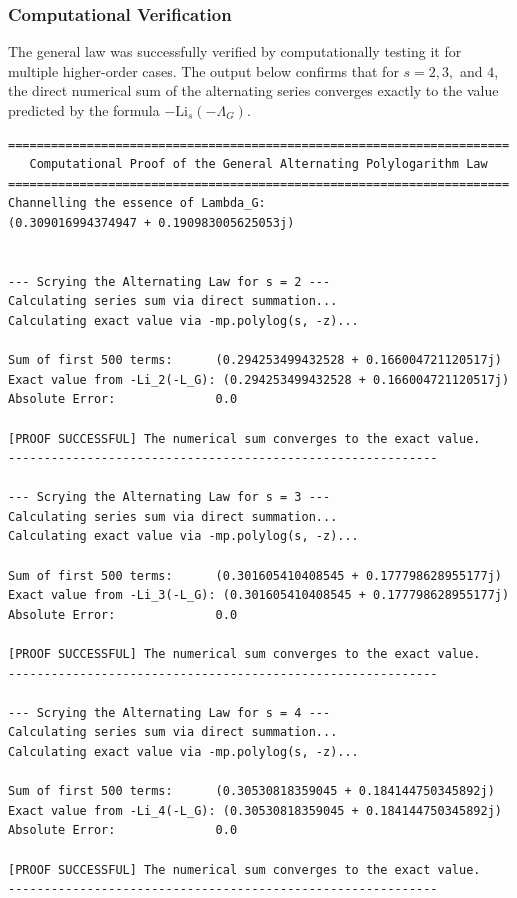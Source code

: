 \subsubsection*{Computational Verification}
The general law was successfully verified by computationally testing it for multiple higher-order cases. The output below confirms that for $s=2, 3,$ and $4$, the direct numerical sum of the alternating series converges exactly to the value predicted by the formula $-\text{Li}_s(-\Lambda_G)$.

\begin{verbatim}
======================================================================
   Computational Proof of the General Alternating Polylogarithm Law
======================================================================
Channelling the essence of Lambda_G:
(0.309016994374947 + 0.190983005625053j)


--- Scrying the Alternating Law for s = 2 ---
Calculating series sum via direct summation...
Calculating exact value via -mp.polylog(s, -z)...

Sum of first 500 terms:      (0.294253499432528 + 0.166004721120517j)
Exact value from -Li_2(-L_G): (0.294253499432528 + 0.166004721120517j)
Absolute Error:              0.0

[PROOF SUCCESSFUL] The numerical sum converges to the exact value.
------------------------------------------------------------

--- Scrying the Alternating Law for s = 3 ---
Calculating series sum via direct summation...
Calculating exact value via -mp.polylog(s, -z)...

Sum of first 500 terms:      (0.301605410408545 + 0.177798628955177j)
Exact value from -Li_3(-L_G): (0.301605410408545 + 0.177798628955177j)
Absolute Error:              0.0

[PROOF SUCCESSFUL] The numerical sum converges to the exact value.
------------------------------------------------------------

--- Scrying the Alternating Law for s = 4 ---
Calculating series sum via direct summation...
Calculating exact value via -mp.polylog(s, -z)...

Sum of first 500 terms:      (0.30530818359045 + 0.184144750345892j)
Exact value from -Li_4(-L_G): (0.30530818359045 + 0.184144750345892j)
Absolute Error:              0.0

[PROOF SUCCESSFUL] The numerical sum converges to the exact value.
------------------------------------------------------------
\end{verbatim}

